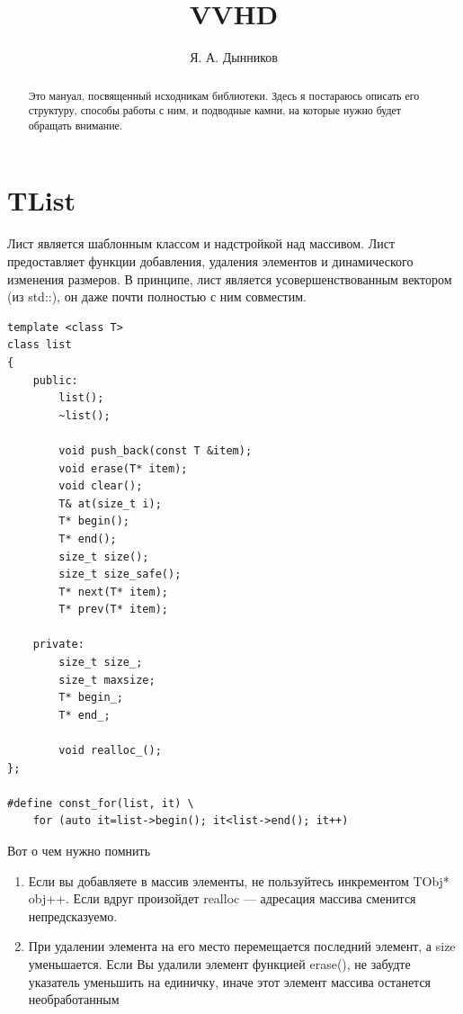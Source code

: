 \documentclass[11pt]{article}
\title{VVHD}
\author{Я. А. Дынников}
\begin{document}
\maketitle

\begin{abstract}
Это мануал, посвященный исходникам библиотеки. Здесь я постараюсь 
описать его структуру, способы работы с ним, и подводные камни, 
на которые нужно будет обращать внимание.
\end{abstract}

\section{TList}
Лист является шаблонным классом и надстройкой над массивом. 
Лист предоставляет функции добавления, удаления элементов и 
динамического изменения размеров. В принципе, лист является 
усовершенствованным вектором (из std::), он даже почти полностью
с ним совместим.

\lstset{language=C++, frame=single}
\begin{lstlisting}
template <class T>
class list
{
	public:
		list();
		~list();

		void push_back(const T &item);
		void erase(T* item);
		void clear();
		T& at(size_t i);
		T* begin();
		T* end();
		size_t size();
		size_t size_safe();
		T* next(T* item);
		T* prev(T* item);

	private:
		size_t size_;
		size_t maxsize;
		T* begin_;
		T* end_;

		void realloc_();
};

#define const_for(list, it) \
	for (auto it=list->begin(); it<list->end(); it++)
\end{lstlisting}

Вот о чем нужно помнить
\begin{enumerate}
\item Если вы добавляете в массив элементы, не пользуйтесь 
инкрементом TObj* obj++. Если вдруг произойдет realloc ---
адресация массива сменится непредсказуемо.
\item При удалении элемента на его место перемещается последний 
элемент, а size уменьшается.
Если Вы удалили элемент функцией erase(), не забудте указатель
уменьшить на единичку, иначе этот элемент массива останется необработанным
\end{enumerate}

\end{document}
